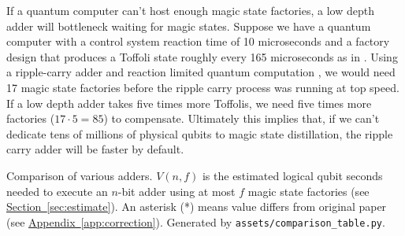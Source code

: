 \documentclass[onecolumn,unpublished]{quantumarticle}
\theoremstyle{definition}
\theoremstyle{definition}
\theoremstyle{definition}
\renewcommand{\sec}[1]{\hyperref[sec:#1]{Section~\ref*{sec:#1}}}
\DeclareRobustCommand{\app}[1]{\hyperref[app:#1]{Appendix~\ref*{app:#1}}}
\begin{document}
If a quantum computer can't host enough magic state factories, a low depth adder will bottleneck waiting for magic states.
Suppose we have a quantum computer with a control system reaction time of 10 microseconds and a factory design that produces a Toffoli state roughly every 165 microseconds as in \cite{gidney2019autoccz}.
Using a ripple-carry adder and reaction limited quantum computation \cite{fowler2012timeoptimal,gidney2019autoccz}, we would need 17 magic state factories before the ripple carry process was running at top speed.
If a low depth adder takes five times more Toffolis, we need five times more factories ($17 \cdot 5 = 85$) to compensate.
Ultimately this implies that, if we can't dedicate tens of millions of physical qubits to magic state distillation, the ripple carry adder will be faster by default.

\begin{table}
\centering
\resizebox{\linewidth}{!}{

}
    \caption{Comparison of various adders.
    $V(n,f)$ is the estimated logical qubit seconds needed to execute an $n$-bit adder using at most $f$ magic state factories (see \sec{estimate}).
    An asterisk (*) means value differs from original paper (see \app{correction}).
    Generated by \texttt{assets/comparison\_table.py}.
    }
    \label{tbl:comparison}
\end{table}
\end{document}

